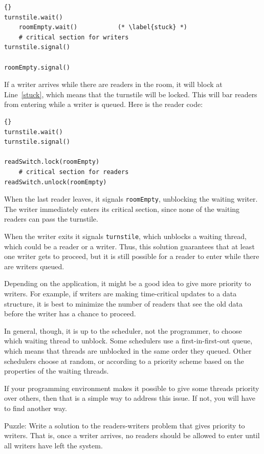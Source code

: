 \documentclass{book}
\begin{document}
\begin{lstlisting}[title={No-starve writer solution}]{}
turnstile.wait()
    roomEmpty.wait()           (* \label{stuck} *)
    # critical section for writers
turnstile.signal()

roomEmpty.signal()
\end{lstlisting}

If a writer arrives while there are readers in the room, it
will block at Line~\ref{stuck}, which means that the turnstile will
be locked.  This will bar readers from entering while a writer
is queued.  Here is the reader code:

\begin{lstlisting}[title={No-starve reader solution}]{}
turnstile.wait()
turnstile.signal()

readSwitch.lock(roomEmpty)
    # critical section for readers
readSwitch.unlock(roomEmpty)
\end{lstlisting}

When the last reader leaves, it signals {\tt roomEmpty},
unblocking the waiting writer.  The writer immediately
enters its critical section, since none of the waiting
readers can pass the turnstile.

When the writer exits it signals {\tt turnstile}, which unblocks a
waiting thread, which could be a reader or a writer.  Thus, this
solution guarantees that at least one writer gets to proceed, but it
is still possible for a reader to enter while there are writers
queued.  

Depending on the application, it might be a good idea to
give more priority to writers.  For example, if writers are making
time-critical updates to a data structure, it is best
to minimize the number of readers that see the old data before
the writer has a chance to proceed.

In general, though, it is up to the scheduler, not the programmer,
to choose which waiting thread to unblock.
Some schedulers use a first-in-first-out queue, which means
that threads are unblocked in the same order they queued.
Other schedulers choose at random, or according to
a priority scheme based on the properties of the waiting
threads.

If your programming environment makes it possible to give
some threads priority over others, then that is a simple way
to address this issue.  If not, you will have to find another
way.

Puzzle: Write a solution to the readers-writers problem that gives
priority to writers.  That is, once a writer arrives, no readers
should be allowed to enter until all writers have left the system.
\end{document}
